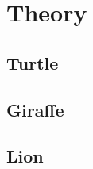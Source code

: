 \chapter{Theory}\label{sec:theory}

\section{Turtle}\label{sec:turtle}
\lipsum[2-4]

\section{Giraffe}\label{subsec:Giraffe}
\lipsum[2-4]

\section{Lion}\label{subsec:Lion}
\lipsum[2-4]
